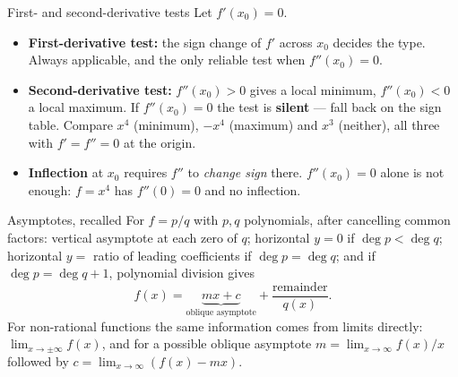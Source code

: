 \begin{rulebox}{First- and second-derivative tests}
Let $f'(x_{0})=0$.
\begin{itemize}[leftmargin=1.6em,itemsep=0.3ex]
  \item \textbf{First-derivative test:} the sign change of $f'$ across
        $x_{0}$ decides the type. Always applicable, and the only reliable
        test when $f''(x_{0})=0$.
  \item \textbf{Second-derivative test:} $f''(x_{0})>0$ gives a local
        minimum, $f''(x_{0})<0$ a local maximum. If $f''(x_{0})=0$ the test
        is \textbf{silent} --- fall back on the sign table. Compare
        $x^{4}$ (minimum), $-x^{4}$ (maximum) and $x^{3}$ (neither), all
        three with $f'=f''=0$ at the origin.
  \item \textbf{Inflection} at $x_{0}$ requires $f''$ to \emph{change
        sign} there. $f''(x_{0})=0$ alone is not enough: $f=x^{4}$ has
        $f''(0)=0$ and no inflection.
\end{itemize}
\end{rulebox}

\begin{rulebox}{Asymptotes, recalled}
For $f=p/q$ with $p,q$ polynomials, after cancelling common factors:
vertical asymptote at each zero of $q$; horizontal $y=0$ if
$\deg p<\deg q$; horizontal $y=$ ratio of leading coefficients if
$\deg p=\deg q$; and if $\deg p=\deg q+1$, polynomial division gives
\[
  f(x)=\underbrace{mx+c}_{\text{oblique asymptote}}+\frac{\text{remainder}}{q(x)} .
\]
For non-rational functions the same information comes from limits directly:
$\lim_{x\to\pm\infty}f(x)$, and for a possible oblique asymptote
$m=\lim_{x\to\infty}f(x)/x$ followed by $c=\lim_{x\to\infty}(f(x)-mx)$.
\end{rulebox}

\begin{gallery}
\hspace*{\fill}%
%
\hspace*{\fill}
\end{gallery}

